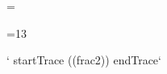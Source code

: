 \newtoks\csNameStr
\def\parseLetterOrCS#1{%
    \def\todo{\ifcat\nextTok a\def\next{\csNameStr={#1}\parseCS}%
                \else\def\next{\addLexed#1\lexTokens}\fi\next}%
    \futurelet\nextTok\todo
}
\def\parseCS{\futurelet\nextTok\parseCSa}
\def\parseCSa{%
    \ifcat\nextTok a\def\next{\addToCSAndCont}%
    \else\def\next{\emitCSAndLex}%
    \fi\next
}
\def\addToCSAndCont#1{%
    \appendTok\csNameStr#1%
    \next\parseCS
}
\def\emitCSAndLex{%
    \edef\nextL{\the\csNameStr}
    \expandafter\expandafter\expandafter\addLexed\expandafter\csname\nextL\endcsname\lexTokens
}



\begingroup
{}=\active
\gdef\defParenCmds{%
    \def\lparen{\char40}%
    \catcode40=13%
    \let(=\parenWrap
}
\endgroup



\newtoks\parenContents
\newcount\parenLevel

\begingroup
{}=13
\gdef\parenWrap{\parenLevel=0\parenContents={}\buildList}
\gdef\buildList#1{%
    \ifx#1)\ifnum\parenLevel>0\def\next{\advance\parenLevel-1%
                                \appendTok\parenContents#1\buildList}
            \else\let\next=\useParenContents\fi
    \else\ifx#1(\advance\parenLevel by 1\fi
        \def\next{\appendTok\parenContents#1\buildList}%
    \fi
    \next
}
\endgroup

\def\useParenContents{\left(\the\parenContents\right)} %




\def\startTrace{\message{Starting trace...}\tracingmacros=2\tracingassigns=2\tracingcommands=2}
\def\endTrace{\message{Ending trace...}\tracingmacros=0\tracingassigns=0\tracingcommands=0}


\def\frac{{2\over\alpha}}
\def\fracfrac{{2^{10}\over\alpha}}
` startTrace ((frac2)) endTrace`

\bye
